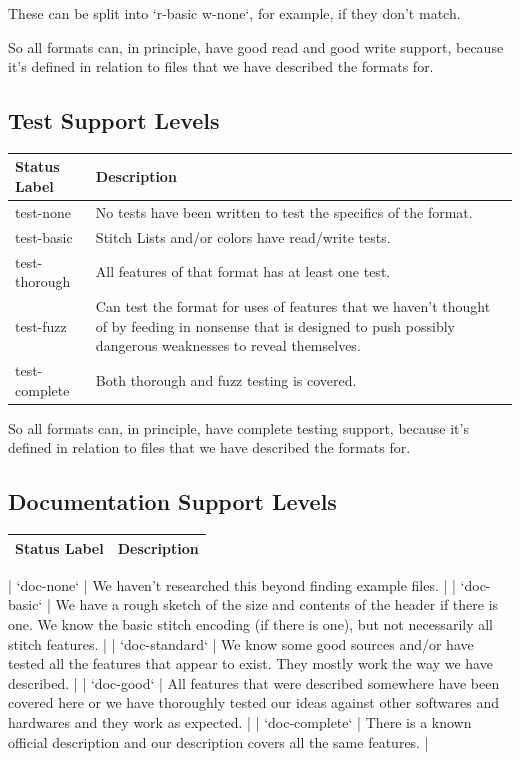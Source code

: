 \documentclass{report}
\begin{document}
These can be split into `r-basic w-none`, for example, if they don't match.

So all formats can, in principle, have good read and good write support, because it's defined in relation to files that we have described the formats for.

\subsection{Test Support Levels}

\begin{longtable}{l p{8cm}}
Status Label & Description \\
\hline
test-none & No tests have been written to test the specifics of the format. \\
test-basic & Stitch Lists and/or colors have read/write tests. \\
test-thorough & All features of that format has at least one test. \\
test-fuzz & Can test the format for uses of features that we haven't thought of by feeding in nonsense that is designed to push possibly dangerous weaknesses to reveal themselves. \\
test-complete & Both thorough and fuzz testing is covered.
\end{longtable}

So all formats can, in principle, have complete testing support, because it's defined in relation to files that we have described the formats for.

\subsection{Documentation Support Levels}

\begin{longtable}{l p{8cm}}
Status Label & Description \\
\hline
\end{longtable}

| `doc-none` | We haven't researched this beyond finding example files. |
| `doc-basic` | We have a rough sketch of the size and contents of the header if there is one. We know the basic stitch encoding (if there is one), but not necessarily all stitch features. |
| `doc-standard` | We know some good sources and/or have tested all the features that appear to exist. They mostly work the way we have described. |
| `doc-good` | All features that were described somewhere have been covered here or we have thoroughly tested our ideas against other softwares and hardwares and they work as expected. |
| `doc-complete` | There is a known official description and our description covers all the same features. |
\end{document}
